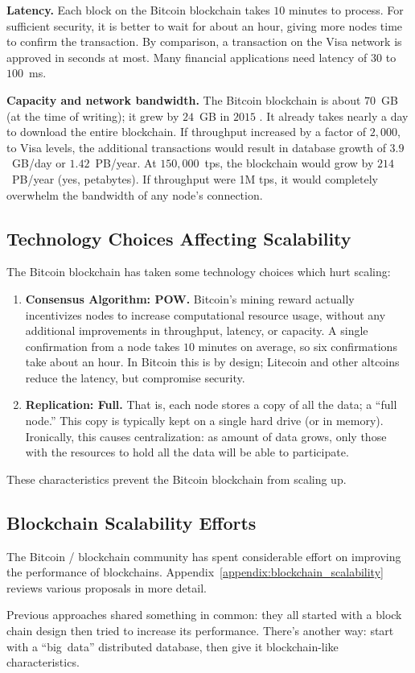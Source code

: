 \medskip
\noindent\textbf{Latency.} Each block on the Bitcoin blockchain takes $10$ minutes to process.
For sufficient security, it is better to wait for about an hour, giving more nodes time to confirm the transaction.
By comparison, a transaction on the Visa network is approved in seconds at most.
Many financial applications need latency of $30$ to $100$~ms.

\medskip
\noindent\textbf{Capacity and network bandwidth.} The Bitcoin blockchain is about $70$~GB (at the time of writing); it grew by $24$~GB in $2015$ \cite{blockchaininfo2015blockchain_size}.
It already takes nearly a day to download the entire blockchain.
If throughput increased by a factor of $2,000$, to Visa levels, the additional transactions would result in database growth of $3.9$~GB/day or $1.42$~PB/year.
At $150,000$~tps, the blockchain would grow by $214$~PB/year (yes, petabytes).
If throughput were 1M tps, it would completely overwhelm the bandwidth of any node’s connection.

\subsection{Technology Choices Affecting Scalability}
The Bitcoin blockchain has taken some technology choices which hurt scaling:
\begin{enumerate}
 \item \textbf{Consensus Algorithm: POW.} Bitcoin’s mining reward actually incentivizes nodes to increase computational resource usage, without any additional improvements in throughput, latency, or capacity. A single confirmation from a node takes $10$ minutes on average, so six confirmations take about an hour. In Bitcoin this is by design; Litecoin and other altcoins reduce the latency, but compromise security.
 \item \textbf{Replication: Full.} That is, each node stores a copy of all the data; a “full node.” This copy is typically kept on a single hard drive (or in memory). Ironically, this causes centralization: as amount of data grows, only those with the resources to hold all the data will be able to participate.
\end{enumerate}

These characteristics prevent the Bitcoin blockchain from scaling up.

\subsection{Blockchain Scalability Efforts}
The Bitcoin / blockchain community has spent considerable effort on improving the performance of blockchains.
Appendix~\ref{appendix:blockchain_scalability} reviews various proposals in more detail.

Previous approaches shared something in common: they all started with a block chain design then tried to increase its performance.
There’s another way: start with a ``big~data'' distributed database, then give it blockchain-like characteristics.
